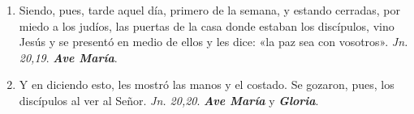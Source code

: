 \documentclass[../../devocionario.tex]{subfiles}
\begin{document}
\begin{enumerate}
        \item Siendo, pues, tarde aquel día, primero de la semana, y estando cerradas, por miedo a los judíos, 
            las puertas de la casa donde estaban los discípulos, vino Jesús y se presentó en medio de ellos y 
            les dice: «la paz sea con vosotros». \textit{Jn. 20,19}. \textbf{\textit{Ave María}}.

        \item Y en diciendo esto, les mostró las manos y el costado. Se gozaron, pues, 
            los discípulos al ver al Señor. \textit{Jn. 20,20}. \textbf{\textit{Ave María}} y \textbf{\textit{Gloria}}.

    \end{enumerate}
\end{document}
